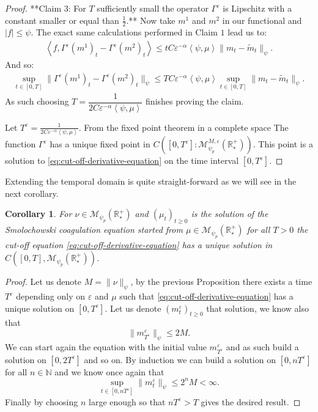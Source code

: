 \documentclass[11pt,a4paper]{article}
\newcommand{\NN}{\mathbb{N}}
\newcommand{\RRP}{\mathbb{R}^+_*}
\newcommand{\MC}{\mathcal{M}}
\newcommand{\Proc}[1]{\left(#1\right)_{t\geq 0}}
\newcommand{\brac}[1]{\left\langle#1\right\rangle}
\newtheorem{corollary}[theorem]{Corollary}
\begin{document}
\begin{proof}
    **Claim 3: For $T$ sufficiently small the operator $\Gamma^\varepsilon$ is Lipschitz with a constant smaller or equal than $\frac12$.** Now take $m^1$ and $m^2$ in our functional and $|f| \leq \psi$. The exact same calculations performed in Claim $1$ lead us to:
    \begin{align*}
        \brac{f, \Gamma^\varepsilon(m^1)_t - \Gamma^\varepsilon(m^2)_t}  \leq tC\varepsilon^{-\alpha}\brac{\psi,\mu} \| m_t - \tilde{m}_t\|_{\psi}.
    \end{align*}
    And so:
    \begin{align*}
        \sup\limits_{t \in [0,T]} \| \Gamma^\varepsilon(m^1)_t - \Gamma^\varepsilon(m^2)_t\|_{\psi}
        \leq TC\varepsilon^{-\alpha}\brac{\psi,\mu}\sup\limits_{t \in [0,T]} \| m_t - \tilde{m}_t\|_{\psi}.
    \end{align*}
    As such choosing $T = \dfrac{1}{2C\varepsilon^{-\alpha}\brac{\psi,\mu}}$ finishes proving the claim.

    Let $T^\varepsilon = \frac{1}{2C\varepsilon^{-\alpha}\brac{\psi,\mu}}$. From the fixed point theorem in a complete space The function $\Gamma^\varepsilon$ has a unique fixed point in \(C\left([0,T^\varepsilon]:\MC^{M,\varepsilon}_{\psi_p}\left(\RRP\right) \right) \). This point is a solution to \eqref{eq:cut-off-derivative-equation} on the time interval $[0,T^\varepsilon]$.
\end{proof}
Extending the temporal domain is quite straight-forward as we will see in the next corollary.
\begin{corollary}\label{cor:well-posedness-derivative-unbounded-space}
    For $\nu \in \MC_{\psi_p}(\RRP)$ and $\Proc{\mu_t}$ is the solution of the Smolochowski coagulation equation started from $\mu \in \MC_{\psi_p}(\RRP)$ for all $T > 0$ the cut-off equation \eqref{eq:cut-off-derivative-equation} has a unique solution in $C\left([0,T],\MC_{\psi_p}(\RRP)\right)$. 
\end{corollary}
\begin{proof}
    Let us denote \(M = \|\nu \|_{\psi}\), by the previous Proposition there exists a time $T^\varepsilon$ depending only on $\varepsilon$ and $\mu$ such that \eqref{eq:cut-off-derivative-equation} has a unique solution on \( [0,T^\varepsilon]\). Let us denote $\Proc{m^\varepsilon_t}$ that solution, we know also that 
    \[\|m^\varepsilon_{T^\varepsilon} \|_{\psi} \leq 2M.\]
    We can start again the equation with the initial value \(m^\varepsilon_{T^\varepsilon}\) and as such build a solution on \( [0,2T^\varepsilon]\) and so on. By induction we can build a solution on \( [0,nT^\varepsilon]\) for all $n \in \NN$ and we know once again that
    \[ \sup\limits_{t \in [0,n T^\varepsilon]}\|m^\varepsilon_{t} \|_{\psi} \leq 2^n M < \infty .\]
    Finally by choosing $n$ large enough so that \( n T^\varepsilon > T\) gives the desired result.
\end{proof}
\end{document}

